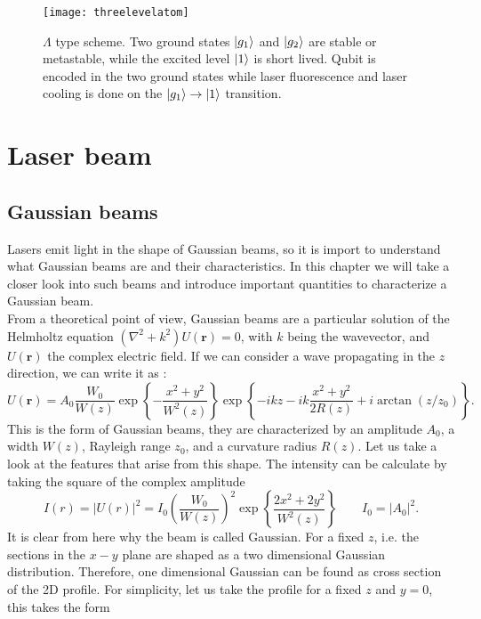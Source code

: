 \begin{figure}
\centering
\texttt{[image: threelevelatom]}
\caption{$\Lambda$ type scheme. Two ground states $\ket{g_1}$ and $\ket{g_2}$ are stable or metastable, while the excited level $\ket{1}$ is short lived. Qubit is encoded in the two ground states while laser fluorescence and laser cooling is done on the $\ket{g_1}\to \ket{1}$ transition.}
\label{threelevel}
\end{figure}
\section{Laser beam}
\subsection{Gaussian beams}
\label{sec_diffraction}
Lasers emit light in the shape of Gaussian beams, so it is import to understand what Gaussian beams are and their characteristics. In this chapter we will take a closer look into such beams and introduce important quantities to characterize a Gaussian beam. \\
From a theoretical point of view, Gaussian beams are a particular solution of the Helmholtz equation $(\nabla^2 + k^2)U(\mathbf{r}) = 0$, with $k$ being the wavevector, and $U(\mathbf{r})$ the complex electric field. If we can consider a wave propagating in the $z$ direction, we can write it as \cite{saleh}:
\begin{equation}
\label{gaussianbeams}
U(\mathbf{r}) = A_0 \frac{W_0}{W(z)}\exp\left\{-\frac{x^2+y^2}{W^2(z)}\right\}\exp\left\{-ikz-ik\frac{x^2+y^2}{2R(z)}+i\arctan(z/z_0)\right\}.
\end{equation}
This is the form of Gaussian beams, they are characterized by an amplitude $A_0$, a width $W(z)$, Rayleigh range $z_0$, and a curvature radius $R(z)$. Let us take a look at the features that arise from this shape. The intensity can be calculate by taking the square of the complex amplitude
\begin{equation}
\label{beamintensity}
I(r) = |U(r)|^2 = I_0 \left(\frac{W_0}{W(z)}\right)^2 \exp\left\{\frac{2x^2 + 2y^2}{W^2(z)}\right\}  \qquad I_0 = |A_0|^2.
\end{equation}
It is clear from here why the beam is called Gaussian. For a fixed $z$, i.e. the sections in the $x-y$ plane are shaped as a two dimensional Gaussian distribution.
Therefore, one dimensional Gaussian can be found as cross section of the 2D profile. For simplicity, let us take the profile for a fixed $z$ and $y=0$, this takes the form
